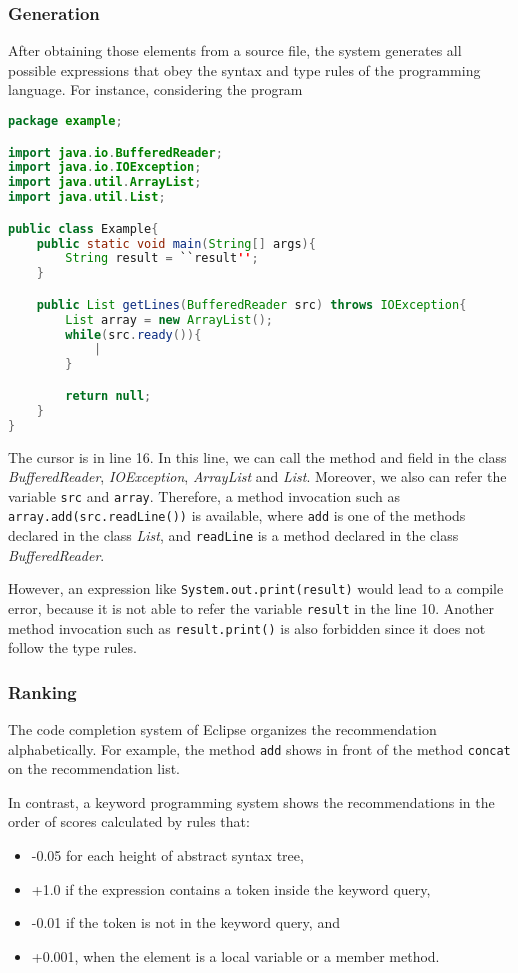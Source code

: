 \documentclass[PRO,english]{ipsj}
\begin{document}
\subsubsection{Generation}
After obtaining those elements from a source file, the system generates all possible expressions that obey the syntax and type rules of the programming language. For instance, considering the program

\begin{lstlisting}[language=Java]
package example;

import java.io.BufferedReader;
import java.io.IOException;
import java.util.ArrayList;
import java.util.List;

public class Example{
	public static void main(String[] args){
	    String result = ``result'';
	}

	public List getLines(BufferedReader src) throws IOException{
	    List array = new ArrayList();
	    while(src.ready()){
	        |
	    }

	    return null;
	}
}
\end{lstlisting}

The cursor is in line 16. In this line, we can call the method and field in the class \textit{BufferedReader}, \textit{IOException}, \textit{ArrayList} and \textit{List}. Moreover, we also can refer the variable \texttt{src} and \texttt{array}. Therefore, a method invocation such as \texttt{array.add(src.readLine())} is available, where \texttt{add} is one of the methods declared in the class \textit{List}, and \texttt{readLine} is a method declared in the class \textit{BufferedReader}. 

However, an expression like \texttt{System.out.print(result)} would lead to a compile error, because it is not able to refer the variable \texttt{result} in the line 10. Another method invocation such as \texttt{result.print()} is also forbidden since it does not follow the type rules.


\subsubsection{Ranking}
\label{subsubsection:Ranking}
The code completion system of Eclipse organizes the recommendation alphabetically. For example, the method \texttt{add} shows in front of the method \texttt{concat} on the recommendation list.

In contrast, a keyword programming system shows the recommendations in the order of scores calculated by rules that:
\begin{itemize}
\item -0.05 for each height of abstract syntax tree,
\item +1.0 if the expression contains a token inside the keyword query,
\item -0.01 if the token is not in the keyword query, and
\item +0.001, when the element is a local variable or a member method.
\end{itemize}
\end{document}
